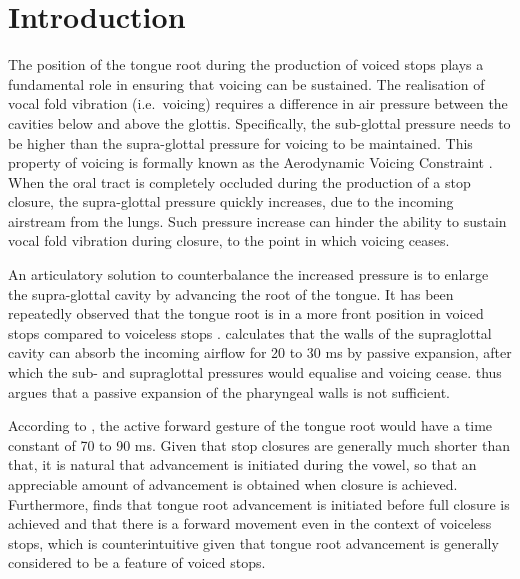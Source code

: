\documentclass[preprint]{JASAnew}
\begin{document}
\section{Introduction}\label{introduction}

The position of the tongue root during the production of voiced stops
plays a fundamental role in ensuring that voicing can be sustained. The
realisation of vocal fold vibration (i.e.~voicing) requires a difference
in air pressure between the cavities below and above the glottis.
Specifically, the sub-glottal pressure needs to be higher than the
supra-glottal pressure for voicing to be maintained. This property of
voicing is formally known as the Aerodynamic Voicing Constraint
\citep{ohala2011}. When the oral tract is completely occluded during the
production of a stop closure, the supra-glottal pressure quickly
increases, due to the incoming airstream from the lungs. Such pressure
increase can hinder the ability to sustain vocal fold vibration during
closure, to the point in which voicing ceases.

An articulatory solution to counterbalance the increased pressure is to
enlarge the supra-glottal cavity by advancing the root of the tongue. It
has been repeatedly observed that the tongue root is in a more front
position in voiced stops compared to voiceless stops
\citep{kent1969, perkell1969, westbury1983}. \citet{rothenberg1967}
calculates that the walls of the supraglottal cavity can absorb the
incoming airflow for 20 to 30 ms by passive expansion, after which the
sub- and supraglottal pressures would equalise and voicing cease.
\citet{rothenberg1967} thus argues that a passive expansion of the
pharyngeal walls is not sufficient.

According to \citet{rothenberg1967}, the active forward gesture of the
tongue root would have a time constant of 70 to 90 ms. Given that stop
closures are generally much shorter than that, it is natural that
advancement is initiated during the vowel, so that an appreciable amount
of advancement is obtained when closure is achieved. Furthermore,
\citet{westbury1983} finds that tongue root advancement is initiated
before full closure is achieved and that there is a forward movement
even in the context of voiceless stops, which is counterintuitive given
that tongue root advancement is generally considered to be a feature of
voiced stops.
\end{document}
